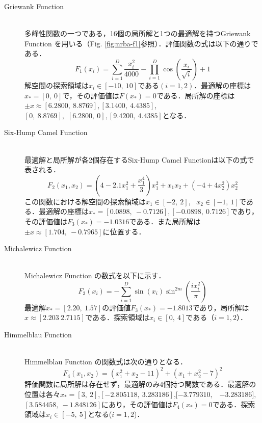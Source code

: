 \documentclass[a4j,11pt]{jarticle}
\begin{document}
\begin{description}
\item[Griewank Function]\mbox{}\\
多峰性関数の一つである，16個の局所解と1つの最適解を持つGriewank Function \cite{f1f3} を用いる（Fig. \ref{fig:nrba-f1}参照）．評価関数の式は以下の通りである．
\begin{equation}
F_1(x_i)=\sum_{i=1}^D \frac{x_i^2}{4000}- \prod_{i=1}^D \cos( \frac{x_i}{\sqrt{i}})+1
\end{equation}
解空間の探索領域は$x_i \in [-10, \ 10]$である$(i=1,2)$．最適解の座標は$x_*=[0, \ 0]$で，その評価値は$F(x_*)=0$である．局所解の座標は$\pm x \approx [6.2800, \ 8.8769], [3.1400, \ 4.4385]$, \\ $[0, \ 8.8769],$  $ [6.2800, \ 0], [9.4200, \ 4.4385]$となる．

\item[Six-Hump Camel Function]\mbox{}\\
最適解と局所解が各2個存在するSix-Hump Camel Function\cite{f1f3}は以下の式で表される．
\begin{equation}
\label{eq:sixhump}
F_2(x_1,x_2)=(4-2.1x_1^2+ \frac{x_1^4}{3})x_1^2+x_1x_2+(-4+4x_2^2)x_2^2
\end{equation}
この関数における解空間の探索領域は$x_1 \in [-2, \ 2]$, \ $x_2 \in [-1, \ 1]$である．最適解の座標は$x_*=[0.0898, \ -0.7126], [-0.0898, \ 0.7126]$であり，その評価値は$F_3(x_*)=-1.0316$である．また局所解は$\pm x \approx [1.704, \ -0.7965]$に位置する．

\item[Michalewicz Function]\mbox{}\\
Michalewicz Function \cite{f1f3} の数式を以下に示す．
\begin{equation}
\label{eq:michalewicz}
F_3(x_i)=- \sum_{i=1}^D \sin(x_i)\sin^{2m}(\frac{ix_i^2}{\pi})
\end{equation}
最適解$x_*=[2.20, \ 1.57]$の評価値$F_3(x_*)=-1.8013$であり，局所解は$x \approx [2.203 \ 2.7115]$である．探索領域は$x_i \in [0, \ 4]$である（$i=1,2$）．

\item[Himmelblau Function]\mbox{}\\
Himmelblau Function \cite{f4} の関数式は次の通りとなる．
\begin{equation}
\label{eq:himmelblau}
F_4(x_1,x_2)=(x_1^2+x_2-11)^2+(x_1+x_2^2-7)^2
\end{equation}
評価関数に局所解は存在せず，最適解のみ4個持つ関数である．最適解の位置は各々$x_*=[3, \ 2]$,$[-2.805118, \ 3.283186]$,$[-3.779310,$  \ $-3.283186],$ $[3.584458, \ -1.848126]$にあり，その評価値は$F_4(x_*)=0$である．探索領域は$x_i \in [-5, \ 5]$となる($i=1,2$)．

\end{description}
\end{document}
